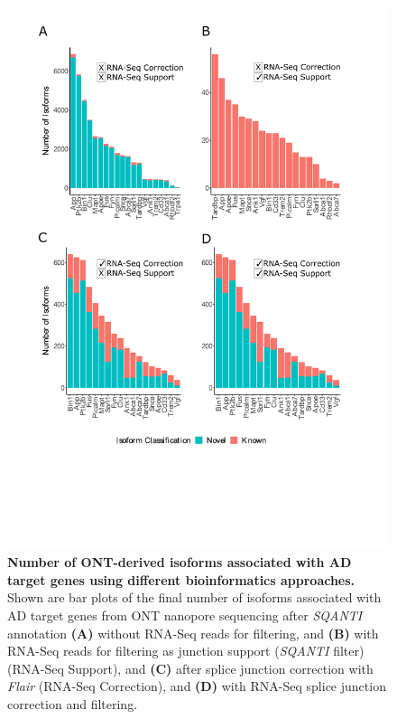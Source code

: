 \begin{figure}[ht]
	\centering
	\includegraphics[page=1,trim={0cm 4cm 0cm 0cm},clip,scale = 0.8]{Figures/ONTTargetedTranscriptome_BioinformaticsPipeline}
	\captionsetup{width=0.95\textwidth,singlelinecheck=off}
	\caption[Number of ONT-derived isoforms associated with AD target genes using different bioinformatics approaches]%
	{\textbf{Number of ONT-derived isoforms associated with AD target genes using different bioinformatics approaches.} Shown are bar plots of the final number of isoforms associated with AD target genes from ONT nanopore sequencing after \textit{SQANTI} annotation \textbf{(A)} without RNA-Seq reads for filtering, and \textbf{(B)} with RNA-Seq reads for filtering as junction support (\textit{SQANTI} filter) (RNA-Seq Support), and \textbf{(C)} after splice junction correction with \textit{Flair} (RNA-Seq Correction), and \textbf{(D)} with RNA-Seq splice junction correction and filtering.   
	}
	\label{fig:ONT_bioinformatics}
\end{figure}

